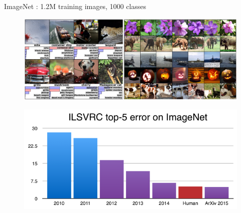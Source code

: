 \begin{frame}{ImageNet : 1.2M training images, 1000 classes}
	
	\vspace{-.6cm}
	
	\begin{figure}
		\centering
		\includegraphics[width=1.04\linewidth]{images/imagenet.png}
		\label{fig:2images}
	\end{figure}
	
	\vspace{-.5cm}
		
	\begin{figure}[h]
		\centering
		\includegraphics[width=.65\linewidth]{images/ILSVRC.png}
		\label{fig:quora-invariance-1}
	\end{figure}

\end{frame}

